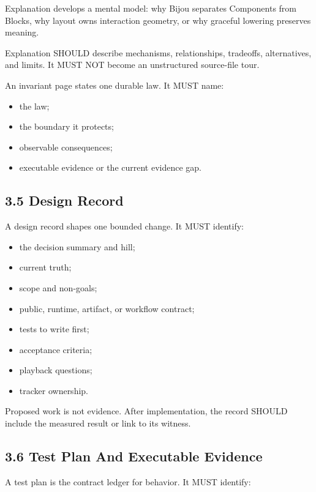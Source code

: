 Explanation develops a mental model: why Bijou separates Components from Blocks, why layout owns interaction geometry, or why graceful lowering preserves meaning.

Explanation SHOULD describe mechanisms, relationships, tradeoffs, alternatives, and limits. It MUST NOT become an unstructured source-file tour.

An invariant page states one durable law. It MUST name:

\begin{itemize}
\tightlist
\item
  the law;
\item
  the boundary it protects;
\item
  observable consequences;
\item
  executable evidence or the current evidence gap.
\end{itemize}

\subsection{3.5 Design Record}\label{record-005-design-record}

A design record shapes one bounded change. It MUST identify:

\begin{itemize}
\tightlist
\item
  the decision summary and hill;
\item
  current truth;
\item
  scope and non-goals;
\item
  public, runtime, artifact, or workflow contract;
\item
  tests to write first;
\item
  acceptance criteria;
\item
  playback questions;
\item
  tracker ownership.
\end{itemize}

Proposed work is not evidence. After implementation, the record SHOULD include the measured result or link to its witness.

\subsection{3.6 Test Plan And Executable Evidence}\label{record-005-test-plan-and-executable-evidence}

A test plan is the contract ledger for behavior. It MUST identify:

